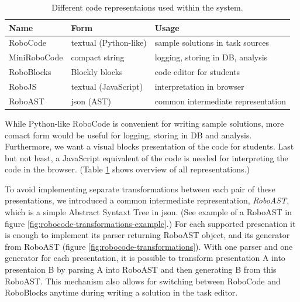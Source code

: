 \begin{table}[h]
\begin{center}
\begin{tabular}{l l l}
\toprule
Name & Form & Usage  \\
\midrule
RoboCode     & textual (Python-like) & sample solutions in task sources  \\
MiniRoboCode & compact string & logging, storing in DB, analysis  \\
RoboBlocks   & Blockly blocks & code editor for students  \\
RoboJS       & textual (JavaScript) & interpretation in browser  \\
RoboAST      & json (AST) & common intermediate representation \\
\bottomrule
\end{tabular}
\end{center}
\caption{Different code representaions used within the system.}
\label{tbl:code-representation}
\end{table}

While Python-like RoboCode is convenient for writing sample solutions,
more comact form would be useful for logging, storing in DB and analysis.
Furthermore, we want a visual blocks presentation of the code for students.
Last but not least, a JavaScript equivalent of the code is needed for
interpreting the code in the browser.
(Table \ref{tbl:code-representation} shows overview of all representations.)

To avoid implementing separate transformations between each pair of these
presentations, we introduced a common intermediate representation,
\emph{RoboAST}, which is a simple Abstract Syntaxt Tree in json.
(See example of a RoboAST in figure \ref{fig:robocode-transformations-example}.)
For each supported presenation it is enough to implement
its parser returning RoboAST object, and
its generator from RoboAST (figure \ref{fig:robocode-transformations}).
With one parser and one generator for each presentation,
it is possible to transform presentation A
into presentaion B by parsing A into RoboAST and
then generating B from this RoboAST.
This mechanism also allows for switching between RoboCode and RoboBlocks
anytime during writing a solution in the task editor.


